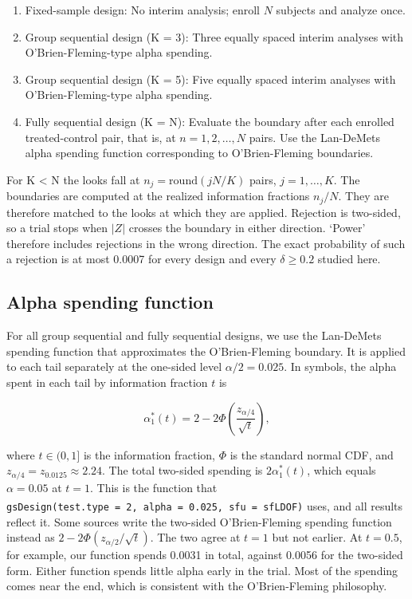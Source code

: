 \documentclass[
  11pt,
]{article}
\providecommand{\tightlist}{%
  \setlength{\itemsep}{0pt}\setlength{\parskip}{0pt}}
\begin{document}
\begin{enumerate}
\def\labelenumi{\arabic{enumi}.}
\tightlist
\item
  Fixed-sample design: No interim analysis;
  enroll \(N\) subjects and analyze once.
\item
  Group sequential design (K = 3): Three equally
  spaced interim analyses with O'Brien-Fleming-type
  alpha spending.
\item
  Group sequential design (K = 5): Five equally
  spaced interim analyses with O'Brien-Fleming-type
  alpha spending.
\item
  Fully sequential design (K = N): Evaluate the
  boundary after each enrolled treated-control pair,
  that is, at \(n = 1, 2, \ldots, N\) pairs. Use the
  Lan-DeMets alpha spending function corresponding
  to O'Brien-Fleming boundaries.
\end{enumerate}

For K \textless{} N the looks fall at \(n_j = \mathrm{round}(jN/K)\)
pairs, \(j = 1, \ldots, K\). The boundaries are computed
at the realized information fractions \(n_j / N\). They
are therefore matched to the looks at which they are
applied. Rejection is two-sided, so a trial stops when
\(|Z|\) crosses the boundary in either direction. `Power'
therefore includes rejections in the wrong direction.
The exact probability of such a rejection is at most
0.0007
for every design and every \(\delta \geq 0.2\) studied
here.

\subsection{Alpha spending function}\label{alpha-spending-function}

For all group sequential and fully sequential designs,
we use the Lan-DeMets spending function that
approximates the O'Brien-Fleming boundary. It is
applied to each tail separately at the one-sided level
\(\alpha/2 = 0.025\). In symbols, the alpha spent in each
tail by information fraction \(t\) is

\[\alpha_1^*(t) = 2 - 2\Phi\left(\frac{z_{\alpha/4}}{\sqrt{t}}\right),\]

where \(t \in (0, 1]\) is the information fraction,
\(\Phi\) is the standard normal CDF, and
\(z_{\alpha/4} = z_{0.0125} \approx 2.24\). The total
two-sided spending is \(2\alpha_1^*(t)\), which equals
\(\alpha = 0.05\) at \(t = 1\). This is the function that
\texttt{gsDesign(test.type\ =\ 2,\ alpha\ =\ 0.025,\ sfu\ =\ sfLDOF)}
uses\textsuperscript{}, and all results reflect
it. Some sources write the two-sided O'Brien-Fleming
spending function instead as
\(2 - 2\Phi(z_{\alpha/2}/\sqrt{t})\). The two agree at
\(t = 1\) but not earlier. At \(t = 0.5\), for example, our
function spends
0.0031
in total, against
0.0056
for the two-sided form. Either function spends little
alpha early in the trial. Most of the spending comes
near the end, which is consistent with the
O'Brien-Fleming philosophy.
\end{document}
